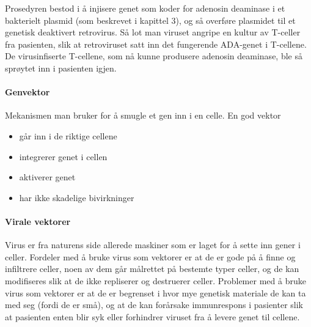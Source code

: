 Prosedyren bestod i å injisere genet som koder for adenosin deaminase i et bakterielt plasmid (som beskrevet i kapittel 3), og så overføre plasmidet til et genetisk deaktivert retrovirus. Så lot man viruset angripe en kultur av T-celler fra pasienten, slik at retroviruset satt inn det fungerende ADA-genet i T-cellene. De virusinfiserte T-cellene, som nå kunne produsere adenosin deaminase, ble så sprøytet inn i pasienten igjen.

\paragraph{Genvektor} Mekanismen man bruker for å smugle et gen inn i en celle. En god vektor
\begin{itemize}[nolistsep,noitemsep]
	\item går inn i de riktige cellene
	\item integrerer genet i cellen
	\item aktiverer genet
	\item har ikke skadelige bivirkninger
\end{itemize}

\paragraph{Virale vektorer} Virus er fra naturens side allerede maskiner som er laget for å sette inn gener i celler. Fordeler med å bruke virus som vektorer er at de er gode på å finne og infiltrere celler, noen av dem går målrettet på bestemte typer celler, og de kan modifiseres slik at de ikke repliserer og destruerer celler. Problemer med å bruke virus som vektorer er at de er begrenset i hvor mye genetisk materiale de kan ta med seg (fordi de er små), og at de kan forårsake immunrespons i pasienter slik at pasienten enten blir syk eller forhindrer viruset fra å levere genet til cellene.

